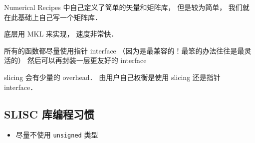 Numerical Recipes 中自己定义了简单的矢量和矩阵库， 但是较为简单， 我们就在此基础上自己写一个矩阵库．

底层用 MKL 来实现， 速度非常快．

所有的函数都尽量使用指针 interface （因为是最兼容的！最笨的办法往往是最灵活的） 然后可以再封装一层更友好的 interface

slicing 会有少量的 overhead． 由用户自己权衡是使用 slicing 还是指针 interface．

\subsection{SLISC 库编程习惯}
\begin{itemize}
\item 尽量不使用 \verb|unsigned| 类型
\end{itemize}
